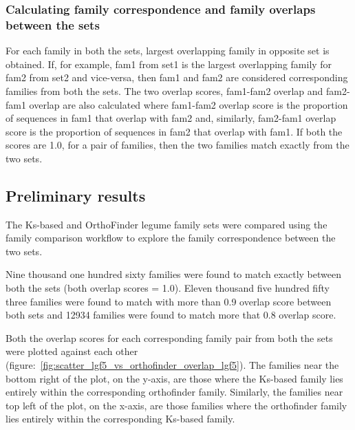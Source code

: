 \documentclass{article}
\begin{document}
			\subsubsection{Calculating family correspondence and family overlaps between the sets}
			For each family in both the sets, largest overlapping family in opposite set  is obtained. If, for example, fam1 from set1 is the largest overlapping family for fam2 from set2 and vice-versa, then fam1 and fam2 are considered corresponding families from both the sets. The two overlap scores, fam1-fam2 overlap and fam2-fam1 overlap are also calculated where fam1-fam2 overlap score is the proportion of sequences in fam1 that overlap with fam2 and, similarly, fam2-fam1 overlap score is the proportion of sequences in fam2 that overlap with fam1. If both the scores are 1.0, for a pair of families, then the two families match exactly from the two sets.
			
		\subsection{Preliminary results}
		The Ks-based and OrthoFinder legume family sets were compared using the family comparison workflow to explore the family correspondence between the two sets.
		
		Nine thousand one hundred sixty families were found to match exactly between both the sets (both overlap scores = 1.0). Eleven thousand five hundred fifty three families were found to match with more than 0.9 overlap score between both sets and 12934 families were found to match more that 0.8 overlap score.
		
		Both the overlap scores for each corresponding family pair from both the sets were plotted against each other (figure:~\ref{fig:scatter_lgf5_vs_orthofinder_overlap_lgf5}). The families near the bottom right of the plot, on the y-axis, are those where the Ks-based family lies entirely within the corresponding orthofinder family. Similarly, the families near top left of the plot, on the x-axis,  are those families where the orthofinder family lies entirely within the corresponding Ks-based family.
		  
\end{document}
